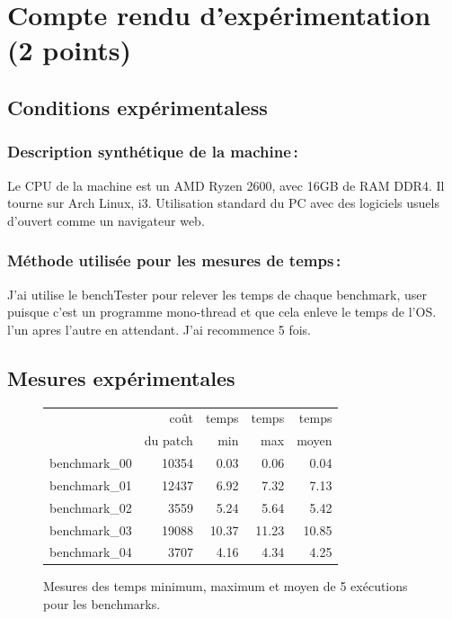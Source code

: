 \documentclass[a4paper,10pt,french]{article}
\begin{document}
\section{Compte rendu d'expérimentation (2 points)}
  \subsection{Conditions expérimentaless}

    \subsubsection{Description synthétique de la machine\,:}
	Le CPU de la machine est un AMD Ryzen 2600, avec 16GB de RAM DDR4. Il tourne sur Arch Linux, i3. Utilisation standard du PC avec des logiciels usuels d'ouvert comme un navigateur web.

    \subsubsection{Méthode utilisée pour les mesures de temps\,: }
	J'ai utilise le benchTester pour relever les temps de chaque benchmark, user puisque c'est un programme mono-thread et que cela enleve le temps de l'OS. l'un apres l'autre en attendant. J'ai recommence 5 fois.

  \subsection{Mesures expérimentales}

    \begin{figure}[h]
      \begin{center}
        \begin{tabular}{|l||r||r|r|r||}
          \hline
          \hline
            & coût         & temps     & temps   & temps \\
            & du patch     & min       & max     & moyen \\
          \hline
          \hline
		  benchmark\_00 &   10354   &  0.03 &  0.06   &  0.04   \\
          \hline
		  benchmark\_01 &   12437   &  6.92 &  7.32   &  7.13   \\
          \hline
		  benchmark\_02 &   3559    &  5.24 &  5.64   &  5.42   \\
          \hline
		  benchmark\_03 &   19088   & 10.37 & 11.23   &  10.85  \\
          \hline
		  benchmark\_04 &   3707    &  4.16 &  4.34   &  4.25   \\
          \hline
          \hline
        \end{tabular}
        \caption{Mesures des temps minimum, maximum et moyen de 5 exécutions pour les benchmarks.}
        \label{table-temps}
      \end{center}
    \end{figure}
\end{document}
